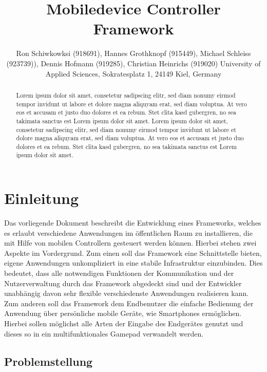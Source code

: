 \documentclass[a4paper]{spie}  %
\title{Mobiledevice Controller Framework} %
\author{ Ron Schiwkowksi  (918691), Hannes Grothknopf (915449), Michael Schleiss (923739)), Dennis Hofmann (919285), Christian Heinrichs (919020)
\skiplinehalf
University of Applied Sciences, Sokratesplatz 1, 24149 Kiel, Germany
}
\begin{document}
 
  \maketitle 
\begin{abstract} %
Lorem ipsum dolor sit amet, consetetur sadipscing elitr, sed diam nonumy eirmod tempor invidunt ut labore et dolore magna aliquyam erat, sed diam voluptua. At vero eos et accusam et justo duo dolores et ea rebum. Stet clita kasd gubergren, no sea takimata sanctus est Lorem ipsum dolor sit amet. Lorem ipsum dolor sit amet, consetetur sadipscing elitr, sed diam nonumy eirmod tempor invidunt ut labore et dolore magna aliquyam erat, sed diam voluptua. At vero eos et accusam et justo duo dolores et ea rebum. Stet clita kasd gubergren, no sea takimata sanctus est Lorem ipsum dolor sit amet.
\end{abstract}


\section{Einleitung} %
Das vorliegende Dokument beschreibt die Entwicklung eines Frameworks, welches es erlaubt verschiedene Anwendungen im öffentlichen Raum zu installieren, die mit Hilfe von mobilen Controllern gesteuert werden können. Hierbei stehen zwei Aspekte im Vordergrund. Zum einen soll das Framework eine Schnittstelle bieten, eigene Anwendungen unkompliziert in eine stabile Infrastruktur einzubinden. Dies bedeutet, dass alle notwendigen Funktionen der Kommunikation und der Nutzerverwaltung durch das Framework abgedeckt sind und der Entwickler unabhängig davon sehr flexible verschiedenste Anwendungen realisieren kann. Zum anderen soll das Framework dem Endbenutzer die einfache Bedienung der Anwendung über persönliche mobile Geräte, wie Smartphones ermöglichen. Hierbei sollen möglichst alle Arten der Eingabe des Endgerätes genutzt und dieses so in ein multifunktionales Gamepad verwandelt werden.

\subsection{Problemstellung}
\end{document}
